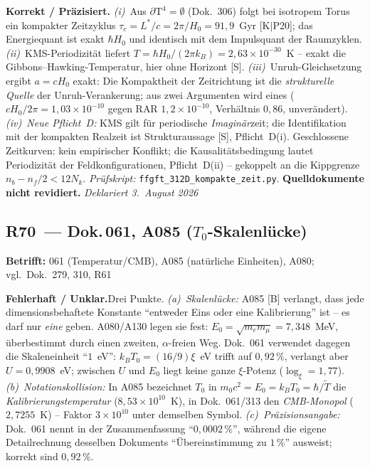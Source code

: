 \smallskip\noindent\textbf{Korrekt / Präzisiert.}\quad
\emph{(i)}~Aus $\partial\text{T}^4 = \emptyset$ (Dok.~306) folgt bei
isotropem Torus ein kompakter Zeitzyklus $\tau_c = L^{*}/c = 2\pi/H_0
= 91{,}9$~Gyr [K$|$P20]; das Energiequant ist exakt $\hbar H_0$ und
identisch mit dem Impulsquant der Raumzyklen. \emph{(ii)}~KMS-Perio\-dizität
liefert $T = \hbar H_0/(2\pi k_B) = 2{,}63\times10^{-30}$~K -- exakt die
Gibbons--Hawking-Temperatur, hier ohne Horizont [S].
\emph{(iii)}~Unruh-Gleichsetzung ergibt $a = cH_0$ exakt: Die Kompaktheit
der Zeitrichtung ist die \emph{strukturelle Quelle} der
Unruh-Verankerung; aus zwei Argumenten wird eines
($cH_0/2\pi = 1{,}03\times10^{-10}$ gegen RAR $1{,}2\times10^{-10}$,
Verhältnis $0{,}86$, unverändert). \emph{(iv)~Neue Pflicht~D:} KMS gilt
für periodische \emph{Imaginär}zeit; die Identifikation mit der
kompakten Realzeit ist Strukturaussage [S], Pflicht~D(i). Geschlossene
Zeitkurven: kein empirischer Konflikt; die Kausalitätsbedingung lautet
Periodizität der Feldkonfigurationen, Pflicht~D(ii) -- gekoppelt an die
Kippgrenze $n_b - n_f/2 < 12N_k$. \emph{Prüfskript:}
\texttt{ffgft\_312D\_kompakte\_zeit.py}.
\textbf{Quelldokumente nicht revidiert.} \emph{Deklariert 3.~August 2026}

\medskip

\subsection*{R70~--- Dok.\,061, A085 ($T_0$-Skalenlücke)}

\noindent\textbf{Betrifft:} 061 (Temperatur/CMB), A085
(natürliche Einheiten), A080; vgl.\ Dok.~279, 310, R61

\smallskip\noindent\textbf{Fehlerhaft / Unklar.}\quad Drei Punkte.
\emph{(a)~Skalenlücke:} A085 [B] verlangt, dass jede dimensionsbehaftete
Konstante \enquote{entweder Eins oder eine Kalibrierung} ist -- es darf
nur \emph{eine} geben. A080/A130 legen sie fest:
$E_0 = \sqrt{m_em_\mu} = 7{,}348$~MeV, überbestimmt durch einen zweiten,
$\alpha$-freien Weg. Dok.~061 verwendet dagegen die Skaleneinheit
\enquote{$1$~eV}: $k_BT_0 = (16/9)\xi$~eV trifft auf $0{,}92\,\%$,
verlangt aber $U = 0{,}9908$~eV; zwischen $U$ und $E_0$ liegt keine
ganze $\xi$-Potenz ($\log_\xi = 1{,}77$). \emph{(b)~Notationskollision:}
In A085 bezeichnet $T_0$ in $m_0c^2 = E_0 = k_BT_0 = \hbar/\tilde T$ die
\emph{Kalibrierungstemperatur} ($8{,}53\times10^{10}$~K), in
Dok.~061/313 den \emph{CMB-Monopol} ($2{,}7255$~K) -- Faktor
$3\times10^{10}$ unter demselben Symbol.
\emph{(c)~Präzisionsangabe:} Dok.~061 nennt in der Zusammenfassung
\enquote{$0{,}0002\,\%$}, während die eigene Detailrechnung
desselben Dokuments \enquote{Übereinstimmung zu $1\,\%$} ausweist;
korrekt sind $0{,}92\,\%$.

